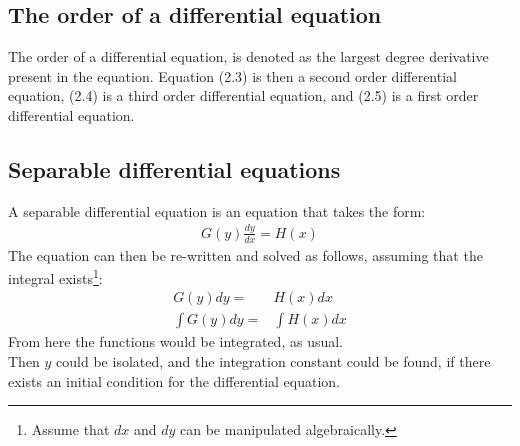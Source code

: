 \subsection{The order of a differential equation}
The order of a differential equation, is denoted as the largest degree derivative present in the equation. Equation (2.3) is then a second order differential equation, (2.4) is a third order differential equation, and (2.5) is a first order differential equation.

\subsection{Separable differential equations} \label{SDE}
A separable differential equation is an equation that takes the form:
\begin{align}
	G(y)\frac{dy}{dx}=H(x)
\end{align}
The equation can then be re-written and solved as follows, assuming that the integral exists\footnote{Assume that $dx$ and $dy$ can be manipulated algebraically. }:
\begin{align}
	G(y)dy=&H(x)dx				\\
	\int G(y)dy =& \int H(x)dx
\end{align}
From here the functions would be integrated, as usual.\\
Then $y$ could be isolated, and the integration constant could be found, if there exists an initial condition for the differential equation.\\
